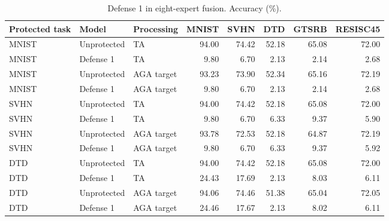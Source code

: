 \begin{table}[t]
\centering\small
\caption{Defense 1 in eight-expert fusion. Accuracy (\%).}
\begin{tabular}{lllrrrrr}
\toprule
Protected task & Model & Processing & MNIST & SVHN & DTD & GTSRB & RESISC45 \\
\midrule
MNIST & Unprotected & TA & 94.00 & 74.42 & 52.18 & 65.08 & 72.00 \\
MNIST & Defense 1 & TA & 9.80 & 6.70 & 2.13 & 2.14 & 2.68 \\
MNIST & Unprotected & AGA target & 93.23 & 73.90 & 52.34 & 65.16 & 72.19 \\
MNIST & Defense 1 & AGA target & 9.80 & 6.70 & 2.13 & 2.14 & 2.68 \\
SVHN & Unprotected & TA & 94.00 & 74.42 & 52.18 & 65.08 & 72.00 \\
SVHN & Defense 1 & TA & 9.80 & 6.70 & 6.33 & 9.37 & 5.90 \\
SVHN & Unprotected & AGA target & 93.78 & 72.53 & 52.18 & 64.87 & 72.19 \\
SVHN & Defense 1 & AGA target & 9.80 & 6.70 & 6.33 & 9.37 & 5.92 \\
DTD & Unprotected & TA & 94.00 & 74.42 & 52.18 & 65.08 & 72.00 \\
DTD & Defense 1 & TA & 24.43 & 17.69 & 2.13 & 8.03 & 6.11 \\
DTD & Unprotected & AGA target & 94.06 & 74.46 & 51.38 & 65.04 & 72.05 \\
DTD & Defense 1 & AGA target & 24.46 & 17.67 & 2.13 & 8.02 & 6.11 \\
\bottomrule
\end{tabular}
\end{table}
